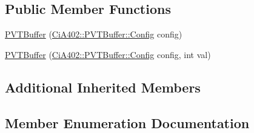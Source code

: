 \subsection*{Public Member Functions}
\begin{DoxyCompactItemize}
\item 
\hyperlink{struct_ci_a402_1_1_p_v_t_buffer_a24a833e7ab9badfd6a2b97aa8c2a8223}{P\+V\+T\+Buffer} (\hyperlink{struct_ci_a402_1_1_p_v_t_buffer_ab39588e1f028f9838c2a85fce3f74926}{Ci\+A402\+::\+P\+V\+T\+Buffer\+::\+Config} config)
\item 
\hyperlink{struct_ci_a402_1_1_p_v_t_buffer_ad526b5b56d2f5d98a77f90d4dde11fc6}{P\+V\+T\+Buffer} (\hyperlink{struct_ci_a402_1_1_p_v_t_buffer_ab39588e1f028f9838c2a85fce3f74926}{Ci\+A402\+::\+P\+V\+T\+Buffer\+::\+Config} config, int val)
\end{DoxyCompactItemize}
\subsection*{Additional Inherited Members}


\subsection{Member Enumeration Documentation}
\hypertarget{struct_ci_a402_1_1_p_v_t_buffer_ab39588e1f028f9838c2a85fce3f74926}{}
